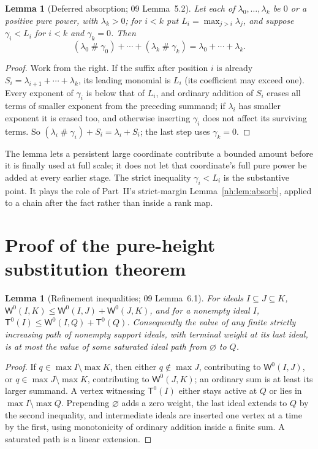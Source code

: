 \documentclass[11pt,a4paper]{article}
\newtheorem{lemma}[theorem]{Lemma}
\theoremstyle{definition}
\theoremstyle{remark}
\newcommand{\ns}{\mathbin{\#}}
\newcommand{\Wz}{\mathsf W^{0}}
\newcommand{\Tz}{\mathsf T^{0}}
\begin{document}
\begin{lemma}[Deferred absorption; 09 Lemma~5.2]\label{nh:wpo:lem:absorb}
Let each of $\lambda_0,\dots,\lambda_k$ be $0$ or a positive pure power, with
$\lambda_k>0$; for $i<k$ put $L_i=\max_{j>i}\lambda_j$, and suppose
$\gamma_i<L_i$ for $i<k$ and $\gamma_k=0$. Then
\begin{equation}\label{nh:wpo:eq:absorb}
 (\lambda_0\ns\gamma_0)+\cdots+(\lambda_k\ns\gamma_k)=\lambda_0+\cdots+\lambda_k .
\end{equation}
\end{lemma}
\begin{proof}
Work from the right. If the suffix after position $i$ is already
$S_i=\lambda_{i+1}+\cdots+\lambda_k$, its leading monomial is $L_i$ (its
coefficient may exceed one). Every exponent of $\gamma_i$ is below that of $L_i$,
and ordinary addition of $S_i$ erases all terms of smaller exponent from the
preceding summand; if $\lambda_i$ has smaller exponent it is erased too, and
otherwise inserting $\gamma_i$ does not affect its surviving terms. So
$(\lambda_i\ns\gamma_i)+S_i=\lambda_i+S_i$; the last step uses $\gamma_k=0$.
\end{proof}

The lemma lets a persistent large coordinate contribute a bounded amount before
it is finally used at full scale; it does not let that coordinate's full pure
power be added at every earlier stage. The strict inequality $\gamma_i<L_i$ is
the substantive point. It plays the role of Part~II's strict-margin
Lemma~\ref{nh:lem:absorb}, applied to a chain after the fact rather than inside
a rank map.

\section{Proof of the pure-height substitution theorem}\label{nh:wpo:sec:proof}

\begin{lemma}[Refinement inequalities; 09 Lemma~6.1]\label{nh:wpo:lem:refinement}
For ideals $I\subseteq J\subseteq K$,
$\Wz(I,K)\le\Wz(I,J)+\Wz(J,K)$, and for a nonempty ideal $I$,
$\Tz(I)\le\Wz(I,Q)+\Tz(Q)$. Consequently the value of any finite strictly
increasing path of nonempty support ideals, with terminal weight at its last
ideal, is at most the value of some saturated ideal path from $\varnothing$ to
$Q$.
\end{lemma}
\begin{proof}
If $q\in\max I\setminus\max K$, then either $q\notin\max J$, contributing to
$\Wz(I,J)$, or $q\in\max J\setminus\max K$, contributing to $\Wz(J,K)$; an
ordinary sum is at least its larger summand. A vertex witnessing $\Tz(I)$ either
stays active at $Q$ or lies in $\max I\setminus\max Q$. Prepending $\varnothing$
adds a zero weight, the last ideal extends to $Q$ by the second inequality, and
intermediate ideals are inserted one vertex at a time by the first, using
monotonicity of ordinary addition inside a finite sum. A saturated path is a
linear extension.
\end{proof}
\end{document}

